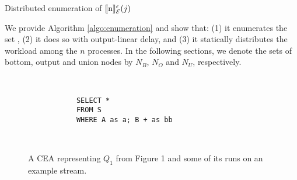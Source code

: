 \begin{algorithm}[H]
  \DontPrintSemicolon
  \SetAlgoNoEnd %
  \SetAlgoNoLine %
\caption{Distributed enumeration of $\llbracket \text{n} \rrbracket^{\epsilon}_{\mathcal{E}}(j)$}
\label{algo:enumeration}
\end{algorithm}

We provide Algorithm \ref{algo:enumeration} and show that: (1) it enumerates the set \enumNode, (2) it does so with output-linear delay, and (3) it statically distributes the workload among the $n$ processes. In the following sections, we denote the sets of bottom, output and union nodes by $N_{B}$, $N_{O}$ and $N_{U}$, respectively.


\begin{figure}[H]
  \centering
  \begin{subfigure}[t]{\textwidth}
    \centering
  \end{subfigure}
  \\
  \begin{subfigure}[b]{\textwidth}
    \begin{verbatim}
      SELECT *
      FROM S
      WHERE A as a; B + as bb
    \end{verbatim}
  \end{subfigure}
  \\
  \begin{subfigure}[b]{\textwidth}
    \centering
  \end{subfigure}
  \caption{A CEA representing $Q_{1}$ from Figure 1 and some of its runs on an example stream.}
  \label{fig:label}
\end{figure}

